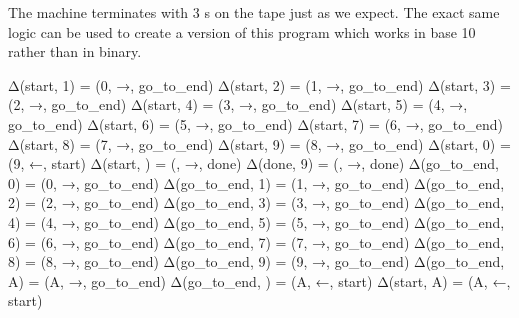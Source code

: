 The machine terminates with 3 s on the tape just as we expect. The exact same logic can be used to create a version of this program which works in base 10 rather than in binary.
\begin{stdout}
Δ(start, 1) = (0, →, go_to_end)
Δ(start, 2) = (1, →, go_to_end)
Δ(start, 3) = (2, →, go_to_end)
Δ(start, 4) = (3, →, go_to_end)
Δ(start, 5) = (4, →, go_to_end)
Δ(start, 6) = (5, →, go_to_end)
Δ(start, 7) = (6, →, go_to_end)
Δ(start, 8) = (7, →, go_to_end)
Δ(start, 9) = (8, →, go_to_end)
Δ(start, 0) = (9, ←, start)
Δ(start, ) = (, →, done)
Δ(done, 9) = (, →, done)
Δ(go_to_end, 0) = (0, →, go_to_end)
Δ(go_to_end, 1) = (1, →, go_to_end)
Δ(go_to_end, 2) = (2, →, go_to_end)
Δ(go_to_end, 3) = (3, →, go_to_end)
Δ(go_to_end, 4) = (4, →, go_to_end)
Δ(go_to_end, 5) = (5, →, go_to_end)
Δ(go_to_end, 6) = (6, →, go_to_end)
Δ(go_to_end, 7) = (7, →, go_to_end)
Δ(go_to_end, 8) = (8, →, go_to_end)
Δ(go_to_end, 9) = (9, →, go_to_end)
Δ(go_to_end, A) = (A, →, go_to_end)
Δ(go_to_end, ) = (A, ←, start)
Δ(start, A) = (A, ←, start)
\end{stdout}
